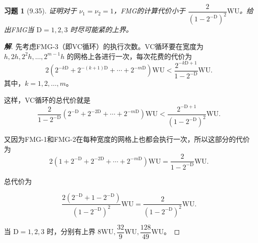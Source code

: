 \documentclass{ctexart}
\newtheorem{ex}{习题}
\newenvironment{sol}{\begin{proof}[\bf 解]}{\end{proof}}
\begin{document}
\begin{ex}[9.35]
    证明对于 $\nu_1=\nu_2=1$，FMG的计算代价小于 $\dfrac 2{(1-2^{-\mathrm{D}})^2}\mathrm{WU}$。给出FMG当 $\mathrm{D}=1,2,3$ 时尽可能紧的上界。
\end{ex}

\begin{sol}
    先考虑FMG-3（即VC循环）的执行次数。VC循环要在宽度为 $h,2h,2^2h,\dots,2^{m-1}h$ 的网格上各进行一次，每次花费的代价为
    \begin{equation}
        2(2^{-k\mathrm{D}}+2^{-(k+1)\mathrm{D}}+ \cdots +2^{-m\mathrm{D}})\mathrm{WU} < \dfrac{2^{-k\mathrm{D}+1}}{1-2^{-\mathrm{D}}}\mathrm{WU}.
    \end{equation}
    其中，$k=1,2,\dots,m$。

    这样，VC循环的总代价就是
    \begin{equation}
        \dfrac 2{1-2^{-\mathrm{D}}}(2^{-\mathrm{D}}+2^{-2\mathrm{D}}+\cdots+2^{-m\mathrm{D}})\mathrm{WU} < \dfrac {2^{-\mathrm{D}+1}}{(1-2^{-\mathrm{D}})^2}\mathrm{WU}.
    \end{equation}

    又因为FMG-1和FMG-2在每种宽度的网格上也都会执行一次，所以这部分的代价为
    \begin{equation}
        2(1+2^{-\mathrm{D}}+2^{-2\mathrm{D}}+\cdots+2^{-m\mathrm{D}})\mathrm{WU} = \dfrac 2{1-2^{-\mathrm{D}}}\mathrm{WU}.
    \end{equation}

    总代价为

    \begin{equation}
        \dfrac {2(2^{-\mathrm{D}}+1-2^{-\mathrm{D}})}{(1-2^{-\mathrm{D}})^2}\mathrm{WU} = \dfrac 2{(1-2^{-\mathrm{D}})^2}\mathrm{WU}.
    \end{equation}

    当 $\mathrm{D} = 1,2,3$ 时，分别有上界 $8\mathrm{WU},\dfrac {32}9\mathrm{WU},\dfrac {128}{49}\mathrm{WU}$。
\end{sol}
\end{document}

